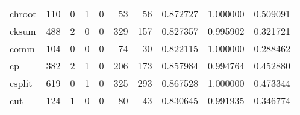 \begin{tabular}{lrrrrrrrrr}
chroot    &                                   110 &                                                  0 &                                                  1 &                                                  0 &                                                 53 &                                                 56 &                                           0.872727 &                               1.000000 &                             0.509091 \\
cksum     &                                   488 &                                                  2 &                                                  0 &                                                  0 &                                                329 &                                                157 &                                           0.827357 &                               0.995902 &                             0.321721 \\
comm      &                                   104 &                                                  0 &                                                  0 &                                                  0 &                                                 74 &                                                 30 &                                           0.822115 &                               1.000000 &                             0.288462 \\
cp        &                                   382 &                                                  2 &                                                  1 &                                                  0 &                                                206 &                                                173 &                                           0.857984 &                               0.994764 &                             0.452880 \\
csplit    &                                   619 &                                                  0 &                                                  1 &                                                  0 &                                                325 &                                                293 &                                           0.867528 &                               1.000000 &                             0.473344 \\
cut       &                                   124 &                                                  1 &                                                  0 &                                                  0 &                                                 80 &                                                 43 &                                           0.830645 &                               0.991935 &                             0.346774 \\

\end{tabular}
